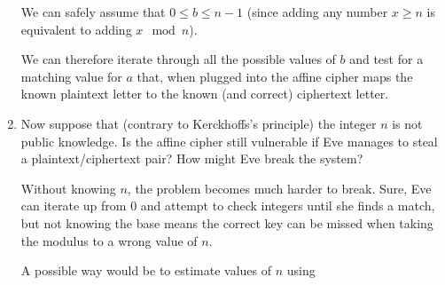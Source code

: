 \begin{problem}
\begin{enumerate}
\begin{Answer}
\noindent
We can safely assume that $0 \le b \le n-1$ 
(since adding any number $x \ge n$ is equivalent to adding
$x \mod n$).

\noindent
We can therefore iterate through all the possible values of $b$ and
test for a matching value for $a$ that, when plugged into the affine cipher
maps the known plaintext letter to the known (and correct) ciphertext letter.

\end{Answer}
\item Now suppose that (contrary to Kerckhoffs's principle) the integer $n$ is not public knowledge.
Is the affine cipher still vulnerable if Eve manages to steal a plaintext/ciphertext pair?
How might Eve break the system?
\begin{Answer}
  
Without knowing $n$, the problem becomes much harder to break.
Sure, Eve can iterate up from $0$ and attempt to check integers until she finds a match,
but not knowing the base means the correct key can be missed when taking the modulus to a wrong value of $n$.

\noindent
A possible way would be to estimate values of $n$ using 

\end{Answer}
\end{enumerate}
\end{problem}

